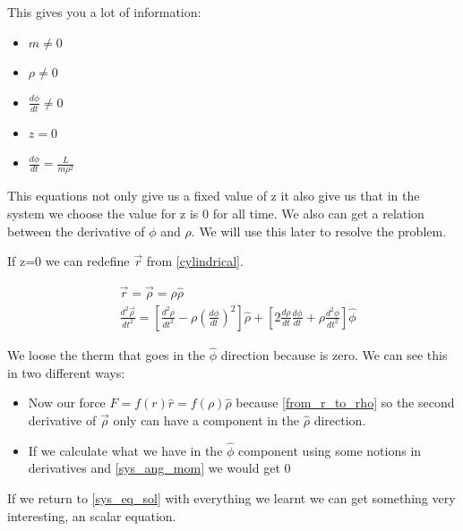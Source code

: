 This gives you a lot of information:

\begin{itemize}
    \item $m \neq 0$
    \item $\rho \neq 0$
    \item $\frac{d\phi}{dt} \neq 0$
    \item $z = 0$
    \item $\frac{d\phi}{dt} = \frac{L}{m\rho^2}$

\end{itemize}

This equations not only give us a fixed value of z it also give us that in the system we choose the value for z is 0 for all time. We also can get a relation between the derivative of $\phi$ and $\rho$. We will use this later to resolve the problem.

If z=0 we can redefine $\vec{r}$ from \ref{cylindrical}.

\begin{equation}
    \label{from_r_to_rho}
    \begin{split}
        &\vec{r} = \vec{\rho} = \rho\hat{\rho} \\
        &\frac{d^2\vec{\rho}}{dt^2} = \left[ \frac{d^2\rho}{dt^2} -\rho\left(\frac{d\phi}{dt}\right)^2 \right]\hat{\rho} + \left[2\frac{d\rho}{dt}\frac{d\phi}{dt} +\rho\frac{d^2\phi}{dt^2} \right]\hat{\phi}
    \end{split}
\end{equation}

We loose the therm that goes in the $\hat{\phi}$ direction because is zero. We can see this in two different ways:

\begin{itemize}
    \item Now our force $F = f(r)\hat{r} = f(\rho)\hat{\rho}$ because \ref{from_r_to_rho} so the second derivative of $\Vec{\rho}$ only can have a component in the $\hat{\rho}$ direction.
    \item If we calculate what we have in the $\hat{\phi}$ component using some notions in derivatives and \ref{sys_ang_mom} we would get 0  
\end{itemize}



If we return to \ref{sys_eq_sol} with everything we learnt we can get something very interesting, an scalar equation.

